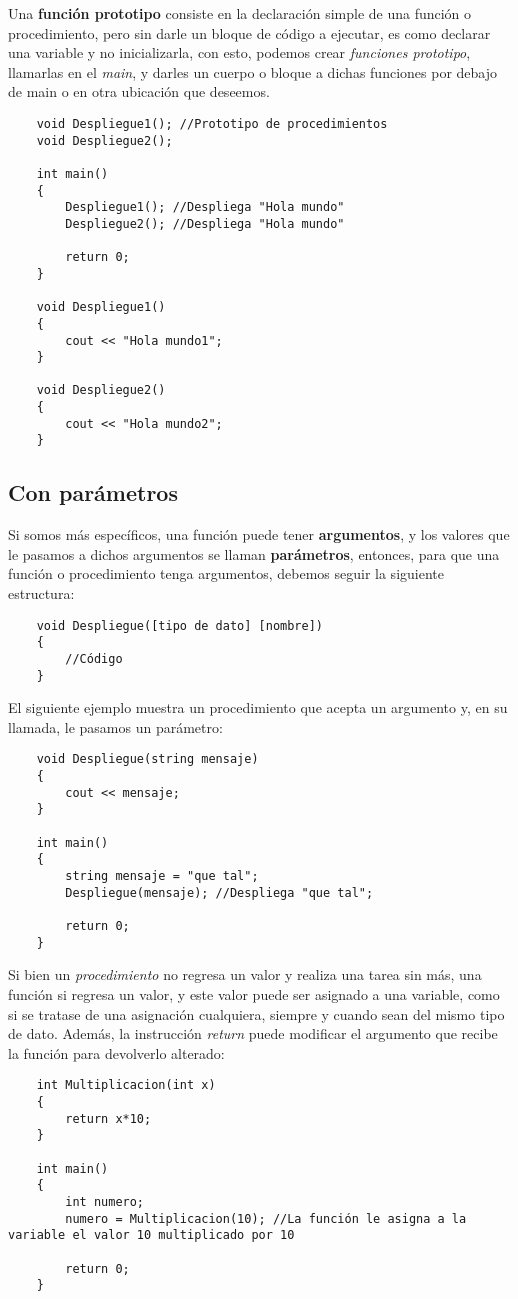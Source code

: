 Una \textbf{función prototipo} consiste en la declaración simple de una función o procedimiento, pero sin darle un bloque de código a ejecutar, es como declarar una variable y no inicializarla, con esto, podemos crear \textit{funciones prototipo}, llamarlas en el \textit{main}, y darles un cuerpo o bloque a dichas funciones por debajo de main o en otra ubicación que deseemos.
\begin{lstlisting}
    void Despliegue1(); //Prototipo de procedimientos
    void Despliegue2();
    
    int main()
    {
        Despliegue1(); //Despliega "Hola mundo"
        Despliegue2(); //Despliega "Hola mundo"
        
        return 0;
    }
    
    void Despliegue1()
    {
        cout << "Hola mundo1";
    }
    
    void Despliegue2()
    {
        cout << "Hola mundo2";
    }
\end{lstlisting}


\subsection{Con parámetros}
\hspace{0.55cm}Si somos más específicos, una función puede tener \textbf{argumentos}, y los valores que le pasamos a dichos argumentos se llaman \textbf{parámetros}, entonces, para que una función o procedimiento tenga argumentos, debemos seguir la siguiente estructura:
\begin{lstlisting}
    void Despliegue([tipo de dato] [nombre])
    {
        //Código
    }
\end{lstlisting}

El siguiente ejemplo muestra un procedimiento que acepta un argumento y, en su llamada, le pasamos un parámetro:
\begin{lstlisting}
    void Despliegue(string mensaje)
    {
        cout << mensaje;
    }
    
    int main()
    {
        string mensaje = "que tal";
        Despliegue(mensaje); //Despliega "que tal";
        
        return 0;
    }
\end{lstlisting}

Si bien un \textit{procedimiento} no regresa un valor y realiza una tarea sin más, una función si regresa un valor, y este valor puede ser asignado a una variable, como si se tratase de una asignación cualquiera, siempre y cuando sean del mismo tipo de dato. Además, la instrucción \textit{return} puede modificar el argumento que recibe la función para devolverlo alterado:
\begin{lstlisting}
    int Multiplicacion(int x)
    {
        return x*10;
    }
    
    int main()
    {
        int numero;
        numero = Multiplicacion(10); //La función le asigna a la variable el valor 10 multiplicado por 10
        
        return 0;
    }
\end{lstlisting}



